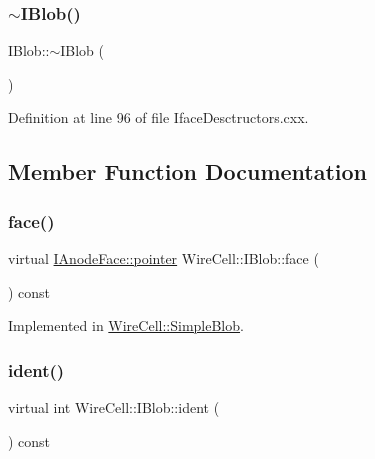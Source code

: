 \subsubsection{\texorpdfstring{$\sim$\+I\+Blob()}{~IBlob()}}
{\footnotesize\ttfamily I\+Blob\+::$\sim$\+I\+Blob (\begin{DoxyParamCaption}{ }\end{DoxyParamCaption})\hspace{0.3cm}{\ttfamily [virtual]}}



Definition at line 96 of file Iface\+Desctructors.\+cxx.



\subsection{Member Function Documentation}
\mbox{\label{class_wire_cell_1_1_i_blob_ab67fa2e25f4d401130f09a64c4e3924a}} 
\subsubsection{\texorpdfstring{face()}{face()}}
{\footnotesize\ttfamily virtual \hyperlink{class_wire_cell_1_1_interface_a09c548fb8266cfa39afb2e74a4615c37}{I\+Anode\+Face\+::pointer} Wire\+Cell\+::\+I\+Blob\+::face (\begin{DoxyParamCaption}{ }\end{DoxyParamCaption}) const\hspace{0.3cm}{\ttfamily [pure virtual]}}



Implemented in \hyperlink{class_wire_cell_1_1_simple_blob_a253020b71e348b9a016ec81a86754ffd}{Wire\+Cell\+::\+Simple\+Blob}.

\mbox{\label{class_wire_cell_1_1_i_blob_a0bad6b376cf6d8880e545ee70ea12dc4}} 
\subsubsection{\texorpdfstring{ident()}{ident()}}
{\footnotesize\ttfamily virtual int Wire\+Cell\+::\+I\+Blob\+::ident (\begin{DoxyParamCaption}{ }\end{DoxyParamCaption}) const\hspace{0.3cm}{\ttfamily [pure virtual]}}



